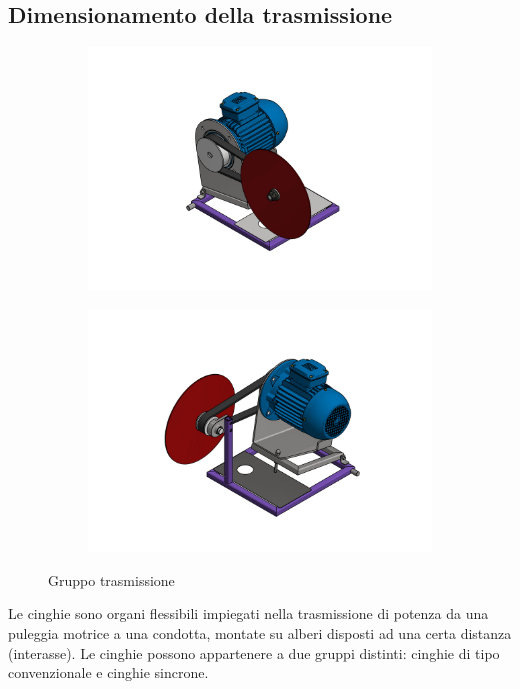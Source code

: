 \documentclass{report}
\begin{document}
  \subsection{Dimensionamento della trasmissione}
  \begin{figure}[H]
    \centering
    \begin{subfigure}[H]{0.45\textwidth}
    \centering
    \includegraphics[width=\textwidth]{src/img/sega_1.pdf}
  \end{subfigure}
  \hfill
  \begin{subfigure}[H]{0.45\textwidth}
    \centering
    \includegraphics[width=\textwidth]{src/img/sega_2.pdf}
    \end{subfigure}
    \caption{Gruppo trasmissione}
    \label{fig:vtcons}
\end{figure}
Le cinghie sono organi flessibili impiegati nella trasmissione di potenza da una puleggia motrice a una condotta, montate su alberi disposti ad una certa distanza (interasse). Le cinghie possono appartenere a due gruppi distinti: cinghie di tipo convenzionale e cinghie sincrone.
\end{document}
